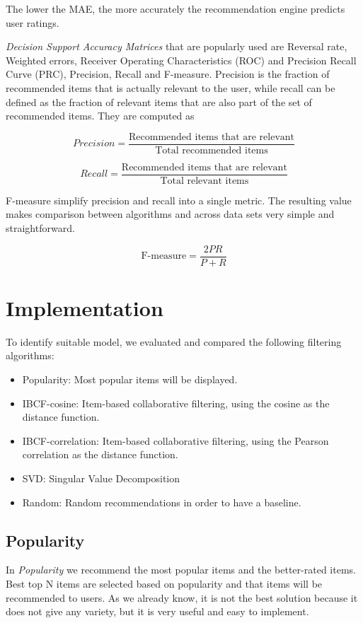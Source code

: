 \documentclass[conference]{IEEEtran}
\begin{document}
The lower the MAE, the more accurately the recommendation engine predicts user ratings.

\textit{Decision Support Accuracy Matrices} that are popularly used
are Reversal rate, Weighted errors, Receiver Operating Characteristics (ROC) and Precision Recall Curve (PRC), Precision, Recall and F-measure.
Precision is the fraction of recommended items that is actually relevant to the user, while recall can be deﬁned as the fraction of relevant items that are also part of the set of recommended items. They are computed as

\begin{equation}
    Precision = \frac{\text{Recommended items that are relevant}}{\text{Total recommended items}}
\end{equation}

\begin{equation}
    Recall = \frac{\text{Recommended items that are relevant}}{\text{Total relevant items}}
\end{equation}

F-measure simplify precision and recall into a single metric. The resulting value makes comparison between algorithms and across data sets very simple and straightforward.

\begin{equation}
    \text{F-measure} = \frac{2PR}{P + R}
\end{equation}

\section{Implementation}
To identify suitable model, we evaluated and compared the following filtering algorithms:
\begin{itemize}
    \item Popularity: Most popular items will be displayed.
    \item IBCF-cosine: Item-based collaborative filtering, using the cosine as the distance function.
    \item IBCF-correlation:  Item-based collaborative filtering, using the Pearson correlation as the distance function.
    \item SVD: Singular Value Decomposition
    \item Random: Random recommendations in order to have a baseline.
\end{itemize}

\subsection{Popularity}\label{AA}
In \textit{Popularity} we recommend the most popular items and the better-rated items. Best top N items are selected based on popularity and that items will be recommended to users. As we already know, it is not the best solution because it does not give any variety, but it is very useful and easy to implement. 
\end{document}
